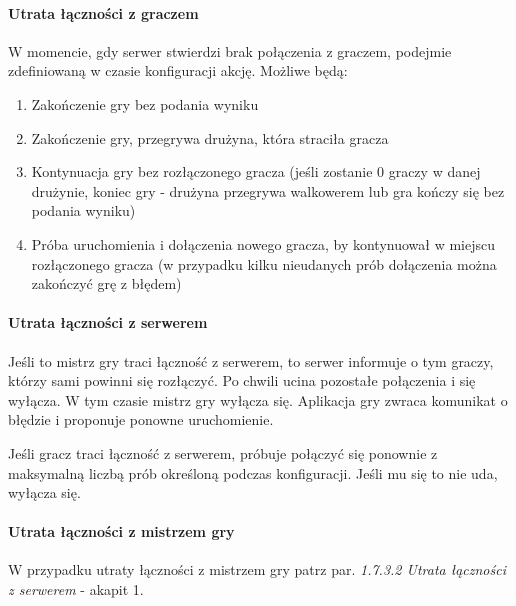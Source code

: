 \documentclass[11pt]{article}
\begin{document}
\paragraph{Utrata łączności z graczem}
\par
W momencie, gdy serwer stwierdzi brak połączenia z graczem, podejmie zdefiniowaną w czasie konfiguracji akcję. Możliwe będą:
\begin{enumerate}
\item Zakończenie gry bez podania wyniku
\item Zakończenie gry, przegrywa drużyna, która straciła gracza
\item Kontynuacja gry bez rozłączonego gracza (jeśli zostanie 0 graczy w danej drużynie, koniec gry - drużyna przegrywa walkowerem lub gra kończy się bez podania wyniku)
\item Próba uruchomienia i dołączenia nowego gracza, by kontynuował w miejscu rozłączonego gracza (w przypadku kilku nieudanych prób dołączenia można zakończyć grę z błędem)
\end{enumerate}

\paragraph{Utrata łączności z serwerem}
\par
Jeśli to mistrz gry traci łączność z serwerem, to serwer informuje o tym graczy, którzy sami powinni się rozłączyć. Po chwili ucina pozostałe połączenia i się wyłącza. W tym czasie mistrz gry wyłącza się. Aplikacja gry zwraca komunikat o błędzie i proponuje ponowne uruchomienie.
\par
Jeśli gracz traci łączność z serwerem, próbuje połączyć się ponownie z maksymalną liczbą prób określoną podczas konfiguracji. Jeśli mu się to nie uda, wyłącza się.

\paragraph{Utrata łączności z mistrzem gry}
\par
W przypadku utraty łączności z mistrzem gry patrz par. \textit{1.7.3.2 Utrata łączności z serwerem} - akapit 1.
\end{document}
